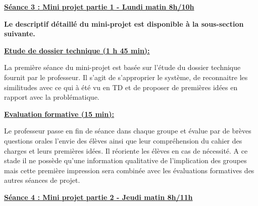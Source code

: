 \documentclass[12pt]{article}
\begin{document}
\color{red}
\textbf{\underline{Séance 3 : Mini projet partie 1 - Lundi matin 8h/10h}}\par
\vspace{10pt}
\color{black}
\textbf{Le descriptif détaillé du mini-projet est disponible à la sous-section suivante.}

\vspace{20pt}
\begin{adjustwidth}{6.5em}{0pt}
\color{blue}
\textbf{\underline{Etude de dossier technique (1 h 45 min):}}\par
\vspace{10pt}
\color{black}
La première séance du mini-projet est basée sur l'étude du dossier technique fournit par le professeur. Il s'agit de s'approprier le système, de reconnaitre les similitudes avec ce qui à été vu en TD et de proposer de premières idées en rapport avec la problématique. \par
\vspace{15pt}

\color{blue}
\hspace{-20pt}\textbf{\underline{Evaluation formative (15 min):}}\par
\vspace{10pt}
\color{black}
Le professeur passe en fin de séance dans chaque groupe et évalue par de brèves questions orales l'envie des élèves ainsi que leur compréhension du cahier des charges et leurs premières idées. Il réoriente les élèves en cas de nécessité. A ce stade il ne possède qu'une information qualitative de l'implication des groupes mais cette première impression sera combinée avec les évaluations formatives des autres séances de projet.
\end{adjustwidth}

\vspace{20pt}

\color{red}
\textbf{\underline{Séance 4 : Mini projet partie 2 - Jeudi matin 8h/11h}}\par
\vspace{10pt}
\color{black}
\end{document}
